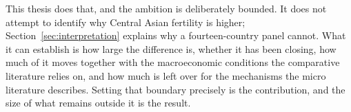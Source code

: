 This thesis does that, and the ambition is deliberately bounded. It does not attempt to identify why Central Asian fertility is higher; Section~\ref{sec:interpretation} explains why a fourteen-country panel cannot. What it can establish is how large the difference is, whether it has been closing, how much of it moves together with the macroeconomic conditions the comparative literature relies on, and how much is left over for the mechanisms the micro literature describes. Setting that boundary precisely is the contribution, and the size of what remains outside it is the result.
